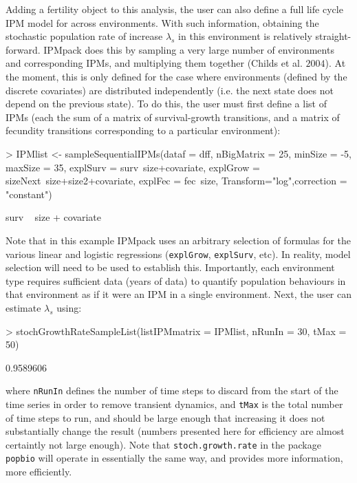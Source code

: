 \documentclass{article}
\begin{document}
Adding a fertility object to this analysis, the user can also define a full life
cycle IPM model for across environments. With such information, obtaining the stochastic population rate of increase $\lambda_s$ in this environment is relatively straight-forward. IPMpack does this by sampling a very large number of environments and corresponding IPMs, and multiplying them together (Childs et al. $2004$). At the moment, this is only defined for the case where environments (defined by the discrete covariates) are distributed independently (i.e. the next state does not depend on the previous state). To do this, the user must first define a list of IPMs (each the sum of a matrix of survival-growth transitions, and a matrix of fecundity transitions corresponding to a particular environment):
\begin{Schunk}
\begin{Sinput}
> IPMlist <- sampleSequentialIPMs(dataf = dff, nBigMatrix = 25, minSize = -5, 
                          maxSize = 35, explSurv = surv~size+covariate, 
                          explGrow = sizeNext~size+size2+covariate, 
                          explFec = fec~size, Transform="log",correction = "constant")
\end{Sinput}
\begin{Soutput}
surv ~ size + covariate
\end{Soutput}
\end{Schunk}
Note that in this example IPMpack uses an arbitrary selection of
formulas for the various linear and logistic
regressions ({\tt explGrow}, {\tt explSurv}, etc). In reality,
model selection will need to be used to establish this. Importantly, each
environment type requires sufficient data (years of data) to quantify population
behaviours in that environment as if it were an IPM in a single environment.  
Next, the user can estimate $\lambda_s$ using:
\begin{Schunk}
\begin{Sinput}
> stochGrowthRateSampleList(listIPMmatrix = IPMlist, 
                            nRunIn = 30, tMax = 50)
\end{Sinput}
\begin{Soutput}
[1] 0.9589606
\end{Soutput}
\end{Schunk}
where {\tt nRunIn} defines the number of time steps to discard from the start of the time series in order to remove transient dynamics, and {\tt tMax} is the total
number of time steps to run, and should be large enough that increasing it does not substantially change the result (numbers presented here for efficiency are almost certaintly not large enough). Note that {\tt stoch.growth.rate} in the package {\tt popbio} will operate in essentially the same way, and provides more information, more efficiently.  
\end{document}
